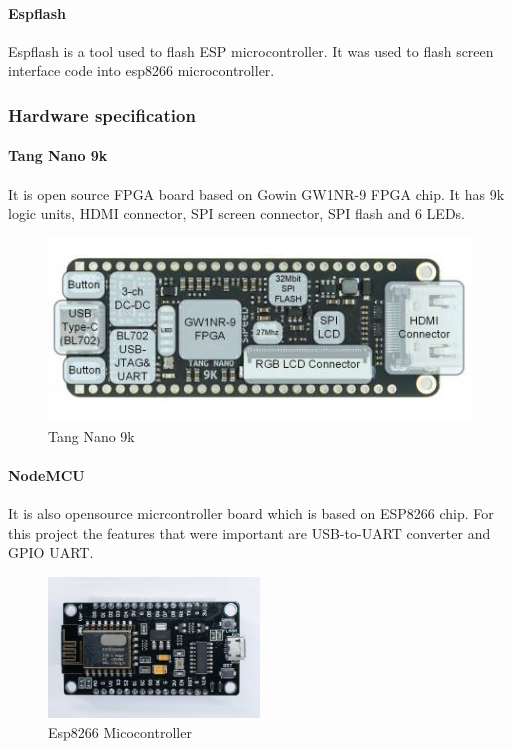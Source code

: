 \documentclass[a4paper,12pt]{article}
\begin{document}
    \paragraph{Espflash}
    Espflash is a tool used to flash ESP microcontroller. It was used to flash screen interface code into esp8266 microcontroller.

    \subsubsection{Hardware specification}

    \paragraph{Tang Nano 9k}
    It is open source FPGA board based on Gowin GW1NR-9 FPGA chip. It has 9k logic units, HDMI connector, SPI screen connector, SPI flash and 6 LEDs.

    \begin{figure}[H]
        \centering
        \includegraphics{./images/fpga.jpg}
        \caption{Tang Nano 9k}
    \end{figure}

    \paragraph{NodeMCU}
    It is also opensource micrcontroller board which is based on ESP8266 chip. For this project the features that were important are USB-to-UART converter and GPIO UART.
    \begin{figure}[H]
        \centering
        \includegraphics[width=0.5\textwidth ]{./images/nodemcu.jpg}
        \caption{Esp8266 Micocontroller}
    \end{figure}
\end{document}
